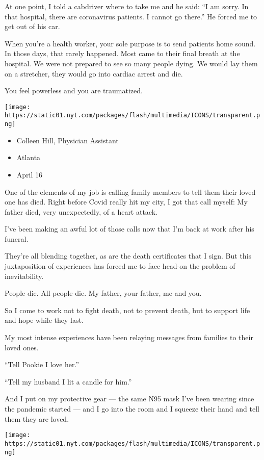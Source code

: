 At one point, I told a cabdriver where to take me and he said: ``I am
sorry. In that hospital, there are coronavirus patients. I cannot go
there.'' He forced me to get out of his car.

When you're a health worker, your sole purpose is to send patients home
sound. In those days, that rarely happened. Most came to their final
breath at the hospital. We were not prepared to see so many people
dying. We would lay them on a stretcher, they would go into cardiac
arrest and die.

You feel powerless and you are traumatized.

\texttt{[image: https://static01.nyt.com/packages/flash/multimedia/ICONS/transparent.png]}

\begin{itemize}
\tightlist
\item
  Colleen Hill, Physician Assistant
\item
  Atlanta
\item
  April 16
\end{itemize}

One of the elements of my job is calling family members to tell them
their loved one has died. Right before Covid really hit my city, I got
that call myself: My father died, very unexpectedly, of a heart attack.

I've been making an awful lot of those calls now that I'm back at work
after his funeral.

They're all blending together, as are the death certificates that I
sign. But this juxtaposition of experiences has forced me to face
head-on the problem of inevitability.

People die. All people die. My father, your father, me and you.

So I come to work not to fight death, not to prevent death, but to
support life and hope while they last.

My most intense experiences have been relaying messages from families to
their loved ones.

``Tell Pookie I love her.''

``Tell my husband I lit a candle for him.''

And I put on my protective gear --- the same N95 mask I've been wearing
since the pandemic started --- and I go into the room and I squeeze
their hand and tell them they are loved.

\texttt{[image: https://static01.nyt.com/packages/flash/multimedia/ICONS/transparent.png]}

